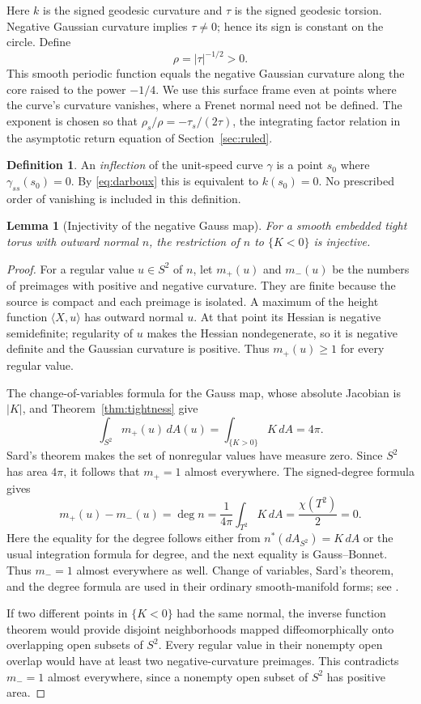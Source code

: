 \documentclass[11pt]{amsart}
\newtheorem{lemma}[theorem]{Lemma}
\theoremstyle{definition}
\newtheorem{definition}[theorem]{Definition}
\begin{document}
Here $k$ is the signed geodesic curvature and $\tau$ is the signed
geodesic torsion. Negative Gaussian curvature implies $\tau\ne0$;
hence its sign is constant on the circle. Define
\begin{equation}\label{eq:rho}
 \rho=|\tau|^{-1/2}>0.
\end{equation}
This smooth periodic function equals the negative Gaussian curvature
along the core raised to the power $-1/4$.
We use this surface frame even
at points where the curve's curvature vanishes, where a Frenet
normal need not be defined.
The exponent is chosen so that
$\rho_s/\rho=-\tau_s/(2\tau)$, the integrating factor relation
in the asymptotic return equation of Section~\ref{sec:ruled}.

\begin{definition}\label{def:inflection}
An \emph{inflection} of the unit-speed curve $\gamma$ is a point
$s_0$ where $\gamma_{ss}(s_0)=0$. By \eqref{eq:darboux} this is
equivalent to $k(s_0)=0$. No prescribed order of vanishing is
included in this definition.
\end{definition}

\begin{lemma}[Injectivity of the negative Gauss map]\label{lem:gauss}
For a smooth embedded tight torus with outward normal $n$, the
restriction of $n$ to $\{K<0\}$ is injective.
\end{lemma}
\begin{proof}
For a regular value $u\in S^2$ of $n$, let $m_+(u)$ and $m_-(u)$
be the numbers of preimages with positive and negative curvature.
They are finite because the source is compact and each preimage
is isolated. A maximum of the height function $\langle X,u\rangle$
has outward normal $u$. At that point its Hessian is negative
semidefinite; regularity of $u$ makes the Hessian nondegenerate,
so it is negative definite and the Gaussian curvature is positive.
Thus $m_+(u)\ge1$ for every regular value.

The change-of-variables formula for the Gauss map, whose absolute
Jacobian is $|K|$, and Theorem~\ref{thm:tightness} give
\[
 \int_{S^2}m_+(u)\,dA(u)=\int_{\{K>0\}}K\,dA=4\pi .
\]
Sard's theorem makes the set of nonregular values have measure zero.
Since $S^2$ has area $4\pi$, it follows that $m_+=1$ almost
everywhere. The signed-degree formula gives
\[
 m_+(u)-m_-(u)=\deg n
 =\frac1{4\pi}\int_{T^2}K\,dA=\frac{\chi(T^2)}2=0.
\]
Here the equality for the degree follows either from
$n^*(dA_{S^2})=K\,dA$ or the usual integration formula for degree,
and the next equality is Gauss--Bonnet. Thus $m_-=1$ almost
everywhere as well. Change of variables, Sard's theorem, and the
degree formula are used in their ordinary smooth-manifold forms;
see \cite[Chapters~6 and~17]{Lee}.

If two different points in $\{K<0\}$ had the same normal, the inverse
function theorem would provide disjoint neighborhoods mapped
diffeomorphically onto overlapping open subsets of $S^2$.
Every regular value in their nonempty open overlap would have at
least two negative-curvature preimages. This contradicts $m_-=1$
almost everywhere, since a nonempty open subset of $S^2$ has
positive area.
\end{proof}
\end{document}
